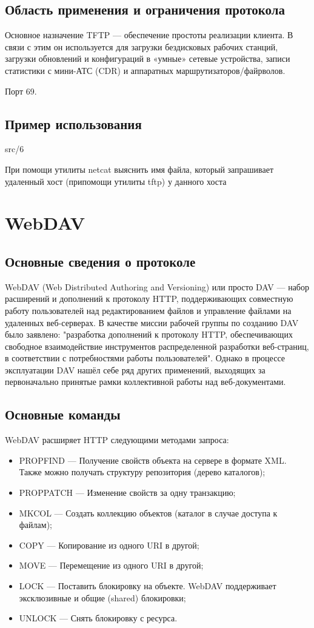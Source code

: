 \subsection{Область применения и ограничения протокола}
Основное назначение TFTP — обеспечение простоты реализации клиента. В связи с этим он используется для загрузки бездисковых рабочих станций, загрузки обновлений и конфигураций в «умные» сетевые устройства, записи статистики с мини-АТС (CDR) и аппаратных маршрутизаторов/файрволов.

Порт 69.

\subsection{Пример использования}
 {src/6}

При помощи утилиты netcat выяснить имя файла, который запрашивает удаленный хост (припомощи утилиты tftp) у данного хоста

\section{WebDAV}

\subsection{Основные сведения о протоколе}
WebDAV (Web Distributed Authoring and Versioning) или просто DAV — набор расширений и дополнений к протоколу HTTP, поддерживающих совместную работу пользователей над редактированием файлов и управление файлами на удаленных веб-серверах. В качестве миссии рабочей группы по созданию DAV было заявлено: "разработка дополнений к протоколу HTTP, обеспечивающих свободное взаимодействие инструментов распределенной разработки веб-страниц, в соответствии с потребностями работы пользователей". Однако в процессе эксплуатации DAV нашёл себе ряд других применений, выходящих за первоначально принятые рамки коллективной работы над веб-документами.

\subsection{Основные команды}
WebDAV расширяет HTTP следующими методами запроса:
\begin{itemize}
\item PROPFIND — Получение свойств объекта на сервере в формате XML. Также можно получать структуру репозитория (дерево каталогов);
\item PROPPATCH — Изменение свойств за одну транзакцию;
\item MKCOL — Создать коллекцию объектов (каталог в случае доступа к файлам);
\item COPY — Копирование из одного URI в другой;
\item MOVE — Перемещение из одного URI в другой;
\item LOCK — Поставить блокировку на объекте. WebDAV поддерживает эксклюзивные и общие (shared) блокировки;
\item UNLOCK — Снять блокировку с ресурса.
\end{itemize}
   
